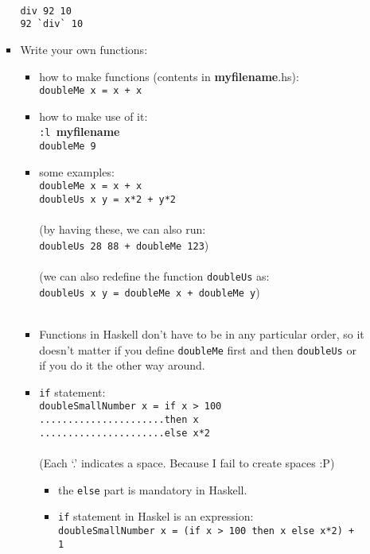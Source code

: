 \documentclass[a4paper,10pt]{article}
\begin{document}
\begin{enumerate}
\begin{enumerate}
\begin{itemize}
  \\\texttt{div 92 10}
  \\\texttt{92 \`{}div\`{} 10}
  \item Write your own functions:
  \begin{itemize}
   \item how to make functions (contents in \textbf{myfilename}.hs):
   \\\texttt{doubleMe x = x + x}
   \\\item how to make use of it:
   \\\texttt{:l }\textbf{myfilename}
   \\\texttt{doubleMe 9}
   \\\item some examples:
   \\\texttt{doubleMe x = x + x}
   \\\texttt{doubleUs x y = x*2 + y*2}
   \\\\(by having these, we can also run: 
   \\\texttt{doubleUs 28 88 + doubleMe 123})
   \\\\(we can also redefine the function \texttt{doubleUs} as:
   \\\texttt{doubleUs x y = doubleMe x + doubleMe y})
   \\\\\item Functions in Haskell don't have to be in any particular order, so it doesn't matter if you define \texttt{doubleMe} first and then \texttt{doubleUs} or if you do it the other way around.
   \\\item \texttt{if} statement:
   \\\texttt{doubleSmallNumber x = if x > 100}
   \\\texttt{......................then x}
   \\\texttt{......................else x*2}
   \\\\(Each `.' indicates a space. Because I fail to create spaces :P)\\
   \begin{itemize}
    \item the \texttt{else} part is mandatory in Haskell.
    \item \texttt{if} statement in Haskel is an expression:
    \\\texttt{doubleSmallNumber\textquotesingle \ x = (if x > 100 then x else x*2) + 1}

\end{itemize}
\end{itemize}
\end{itemize}
\end{enumerate}
\end{enumerate}
\end{document}
